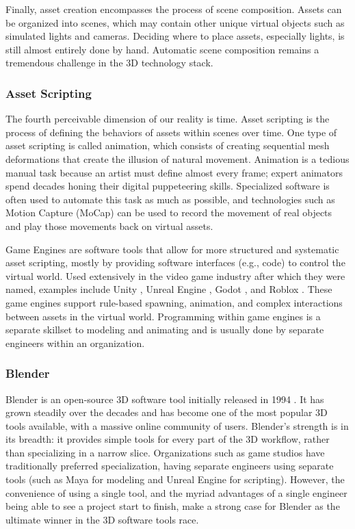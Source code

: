 \documentclass{article}
\begin{document}
Finally, asset creation encompasses the process of scene composition. Assets can be organized into scenes, which may contain other unique virtual objects such as simulated lights and cameras. Deciding where to place assets, especially lights, is still almost entirely done by hand. Automatic scene composition remains a tremendous challenge in the 3D technology stack.

\subsubsection{Asset Scripting}
\label{sec:assetscripting}

The fourth perceivable dimension of our reality is time. Asset scripting is the process of defining the behaviors of assets within scenes over time. One type of asset scripting is called animation, which consists of creating sequential mesh deformations that create the illusion of natural movement. Animation is a tedious manual task because an artist must define almost every frame; expert animators spend decades honing their digital puppeteering skills. Specialized software is often used to automate this task as much as possible, and technologies such as Motion Capture (MoCap) can be used to record the movement of real objects and play those movements back on virtual assets.

Game Engines are software tools that allow for more structured and systematic asset scripting, mostly by providing software interfaces (e.g., code) to control the virtual world. Used extensively in the video game industry after which they were named, examples include Unity \cite{unity3d}, Unreal Engine \cite{unrealengine}, Godot \cite{godot}, and Roblox \cite{roblox}. These game engines support rule-based spawning, animation, and complex interactions between assets in the virtual world. Programming within game engines is a separate skillset to modeling and animating and is usually done by separate engineers within an organization.

\subsubsection{Blender}
\label{sec:blender}

Blender is an open-source 3D software tool initially released in 1994 \cite{blender}. It has grown steadily over the decades and has become one of the most popular 3D tools available, with a massive online community of users. Blender’s strength is in its breadth: it provides simple tools for every part of the 3D workflow, rather than specializing in a narrow slice. Organizations such as game studios have traditionally preferred specialization, having separate engineers using separate tools (such as Maya for modeling and Unreal Engine for scripting). However, the convenience of using a single tool, and the myriad advantages of a single engineer being able to see a project start to finish, make a strong case for Blender as the ultimate winner in the 3D software tools race. 
\end{document}
